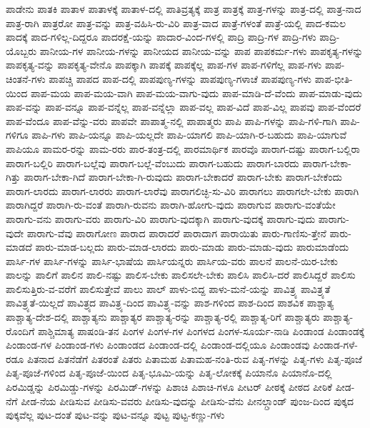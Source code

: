 {ಪಾಡೇನು
ಪಾತಕಿ
ಪಾತಾಳ
ಪಾತಾಳಕ್ಕೆ
ಪಾತಾಳ-ದಲ್ಲಿ
ಪಾತಿವ್ರತ್ಯಕ್ಕೆ
ಪಾತ್ರ
ಪಾತ್ರಕ್ಕೆ
ಪಾತ್ರ-ಗಳನ್ನು
ಪಾತ್ರ-ದಲ್ಲಿ
ಪಾತ್ರ-ನಾದ
ಪಾತ್ರ-ರಾಗಿ
ಪಾತ್ರರೋ
ಪಾತ್ರ-ವನ್ನು
ಪಾತ್ರ-ವಹಿಸಿ-ರು-ವಿರಿ
ಪಾತ್ರ-ವಾದ
ಪಾತ್ರೆ-ಗಳಂತೆ
ಪಾತ್ರೆ-ಯಲ್ಲಿ
ಪಾದ-ಕಮಲ
ಪಾದಕ್ಕೆ
ಪಾದ-ಗಳಿಲ್ಲ-ದಿದ್ದರೂ
ಪಾದರಕ್ಷೆ-ಯನ್ನು
ಪಾದಾರ-ವಿಂದ-ಗಳಲ್ಲಿ
ಪಾದ್ರಿ
ಪಾದ್ರಿ-ಗಳ
ಪಾದ್ರಿ-ಗಳು
ಪಾದ್ರಿ-ಯೊಬ್ಬರು
ಪಾನೀಯ-ಗಳ
ಪಾನೀಯ-ಗಳನ್ನು
ಪಾನೀಯದ
ಪಾನೀಯ-ವನ್ನು
ಪಾಪ
ಪಾಪಕರ್ಮ-ಗಳು
ಪಾಪಕೃತ್ಯ-ಗಳನ್ನು
ಪಾಪಕೃತ್ಯ-ವನ್ನು
ಪಾಪಕೃತ್ಯ-ವೇನೊ
ಪಾಪಕ್ಕಾಗಿ
ಪಾಪಕ್ಕೆ
ಪಾಪಕ್ಕೆಲ್ಲ
ಪಾಪ-ಗಳ
ಪಾಪ-ಗಳಿಗೆಲ್ಲ
ಪಾಪ-ಗಳು
ಪಾಪ-ಚಿಂತನೆ-ಗಳು
ಪಾಪಚ್ಚಿ
ಪಾಪದ
ಪಾಪ-ದಲ್ಲಿ
ಪಾಪಪುಣ್ಯ-ಗಳನ್ನು
ಪಾಪಪುಣ್ಯ-ಗಳಾಚೆ
ಪಾಪಪುಣ್ಯ-ಗಳು
ಪಾಪ-ಭೀತಿ-ಯಿಂದ
ಪಾಪ-ಮಯ
ಪಾಪ-ಮಯ-ವಾಗಿ
ಪಾಪ-ಮಯ-ವಾಗು-ವುದು
ಪಾಪ-ಮಾಡಿ-ದೆ-ವೆಂದು
ಪಾಪ-ಮಾಡು-ವುದು
ಪಾಪ-ವನ್ನು
ಪಾಪ-ವನ್ನೂ
ಪಾಪ-ವನ್ನೆಲ್ಲ
ಪಾಪ-ವನ್ನೆಲ್ಲಾ
ಪಾಪ-ವಲ್ಲ
ಪಾಪ-ವಿದೆ
ಪಾಪ-ವಿಲ್ಲ
ಪಾಪವು
ಪಾಪ-ವೆಂದರೆ
ಪಾಪ-ವೆಂದೂ
ಪಾಪ-ವೆನ್ನು-ವರು
ಪಾಪವೇ
ಪಾಪಾತ್ಮ-ನಲ್ಲಿ
ಪಾಪಾತ್ಮರು
ಪಾಪಿ
ಪಾಪಿ-ಗಳನ್ನು
ಪಾಪಿ-ಗಳಿ-ಗಾಗಿ
ಪಾಪಿ-ಗಳಿಗೂ
ಪಾಪಿ-ಗಳು
ಪಾಪಿ-ಯನ್ನೂ
ಪಾಪಿ-ಯಲ್ಲದೇ
ಪಾಪಿ-ಯಾಗಲಿ
ಪಾಪಿ-ಯಾಗಿ-ರ-ಬಹುದು
ಪಾಪಿ-ಯಾಗುವೆ
ಪಾಪಿಯೂ
ಪಾಮರ-ರನ್ನು
ಪಾಮ-ರರು
ಪಾರ-ತಂತ್ರ-ದಲ್ಲಿ
ಪಾರಮಾರ್ಥಿಕ
ಪಾರವೊ
ಪಾರಾಗ-ದಷ್ಟು
ಪಾರಾಗ-ಬಲ್ಲಿರಾ
ಪಾರಾಗ-ಬಲ್ಲಿರಿ
ಪಾರಾಗ-ಬಲ್ಲೆವು
ಪಾರಾಗ-ಬಲ್ಲೆ-ವೆಂಬುದು
ಪಾರಾಗ-ಬಹುದು
ಪಾರಾಗ-ಬಾರದು
ಪಾರಾಗ-ಬೇಕಾ-ಗಿತ್ತು
ಪಾರಾಗ-ಬೇಕಾ-ಗಿದೆ
ಪಾರಾಗ-ಬೇಕಾ-ಗಿ-ರುವುದು
ಪಾರಾಗ-ಬೇಕಾದರೆ
ಪಾರಾಗ-ಬೇಕು
ಪಾರಾಗ-ಬೇಕೆಂದು
ಪಾರಾಗ-ಲಾರದು
ಪಾರಾಗ-ಲಾರರು
ಪಾರಾಗ-ಲಾರೆವು
ಪಾರಾಗಲಿಚ್ಛಿ-ಸು-ವಿರಿ
ಪಾರಾಗಲು
ಪಾರಾಗಲೇ-ಬೇಕು
ಪಾರಾಗಿ
ಪಾರಾಗಿದ್ದರೆ
ಪಾರಾಗಿ-ರು-ವಂತೆ
ಪಾರಾಗಿ-ರುವನು
ಪಾರಾಗಿ-ಹೋಗು-ವುದು
ಪಾರಾಗುವ
ಪಾರಾಗು-ವಂತೆಯೇ
ಪಾರಾಗು-ವನು
ಪಾರಾಗು-ವರು
ಪಾರಾಗು-ವಿರಿ
ಪಾರಾಗು-ವುದಕ್ಕಾಗಿ
ಪಾರಾಗು-ವುದಕ್ಕೆ
ಪಾರಾಗು-ವುದು
ಪಾರಾಗು-ವುದೇ
ಪಾರಾಗು-ವೆವು
ಪಾರಾಗೋಣ
ಪಾರಾದ
ಪಾರಾದರೆ
ಪಾರಾದಾಗ
ಪಾರಾಯಿತು
ಪಾರು-ಗಾಣಿಸು-ತ್ತೇನೆ
ಪಾರು-ಮಾಡದೆ
ಪಾರು-ಮಾಡ-ಬಲ್ಲದು
ಪಾರು-ಮಾಡ-ಲಾರದು
ಪಾರು-ಮಾಡು
ಪಾರು-ಮಾಡು-ವುದು
ಪಾರುಮಾಡೆಂದು
ಪಾರ್ಸಿ-ಗಳ
ಪಾರ್ಸಿ-ಗಳನ್ನು
ಪಾರ್ಸಿ-ಭಾಷೆಯ
ಪಾರ್ಸಿಯನ್ನರು
ಪಾರ್ಸಿಯ-ವರು
ಪಾಲನೆ
ಪಾಲನೆ-ಯಿರ-ಬೇಕು
ಪಾಲನ್ನು
ಪಾಲಿಗೆ
ಪಾಲಿನ
ಪಾಲಿ-ನಷ್ಟು
ಪಾಲಿಸ-ಬೇಕು
ಪಾಲಿಸಲೇ-ಬೇಕು
ಪಾಲಿಸಿ
ಪಾಲಿಸಿ-ದರೆ
ಪಾಲಿಸಿದ್ದರೆ
ಪಾಲಿಸು
ಪಾಲಿಸುತ್ತಿರು-ವ-ವರೆಗೆ
ಪಾಲಿಸುತ್ತೇವೆ
ಪಾಲು
ಪಾಲ್
ಪಾಳು-ಬಿದ್ದ
ಪಾಳು-ಮನೆ-ಯನ್ನು
ಪಾವಿತ್ರ್ಯ
ಪಾವಿತ್ರ್ಯತೆ
ಪಾವಿತ್ರ್ಯತೆ-ಯಿಲ್ಲದೆ
ಪಾವಿತ್ರ್ಯದ
ಪಾವಿತ್ರ್ಯ-ದಿಂದ
ಪಾವಿತ್ರ್ಯ-ವನ್ನು
ಪಾಶ-ಗಳಿಂದ
ಪಾಶ-ದಿಂದ
ಪಾಶವಿಕ
ಪಾಶ್ಚಾತ್ಯ
ಪಾಶ್ಚಾತ್ಯ-ದೇಶ-ದಲ್ಲಿ
ಪಾಶ್ಚಾತ್ಯನು
ಪಾಶ್ಚಾತ್ಯರ
ಪಾಶ್ಚಾತ್ಯ-ರನ್ನು
ಪಾಶ್ಚಾತ್ಯ-ರಲ್ಲಿ
ಪಾಶ್ಚಾತ್ಯ-ರಿಗೆ
ಪಾಶ್ಚಾತ್ಯರು
ಪಾಶ್ಚಾತ್ಯ-ರೊಂದಿಗೆ
ಪಾಶ್ಚಿಮಾತ್ಯ
ಪಾಷಂಡಿ-ತನ
ಪಿಂಗಳ
ಪಿಂಗಳ-ಗಳ
ಪಿಂಗಳದ
ಪಿಂಗಳ-ಸೂರ್ಯ-ನಾಡಿ
ಪಿಂಡಾಂಡ
ಪಿಂಡಾಂಡಕ್ಕೆ
ಪಿಂಡಾಂಡ-ಗಳ
ಪಿಂಡಾಂಡ-ಗಳು
ಪಿಂಡಾಂಡದ
ಪಿಂಡಾಂಡ-ದಲ್ಲಿ
ಪಿಂಡಾಂಡ-ದಲ್ಲಿಯೂ
ಪಿಂಡಾಂಡವು
ಪಿಂಡಾಡ-ಗಳೆ-ರಡೂ
ಪಿತನಾದ
ಪಿತನೆಡೆಗೆ
ಪಿತರಂತೆ
ಪಿತರು
ಪಿತಾಮಹ
ಪಿತಾಮಹ-ನಂತಿ-ರುವ
ಪಿತೃ-ಗಳನ್ನು
ಪಿತೃ-ಗಳು
ಪಿತೃ-ಪೂಜೆ
ಪಿತೃ-ಪೂಜೆ-ಗಳಿಂದ
ಪಿತೃ-ಪೂಜೆ-ಯಿಂದ
ಪಿತೃ-ಭೂಮಿ-ಯನ್ನು
ಪಿತೃ-ಲೋಕಕ್ಕೆ
ಪಿಯಾನೊ
ಪಿಯಾನೊ-ದಲ್ಲಿ
ಪಿರಮಿಡ್ಡನ್ನು
ಪಿರಮಿಡ್ಡು-ಗಳನ್ನು
ಪಿರಮಿಡ್-ಗಳನ್ನು
ಪಿಶಾಚಿ
ಪಿಶಾಚಿ-ಗಳೂ
ಪೀಟರ್
ಪೀಠಕ್ಕೆ
ಪೀಠದ
ಪೀಠಿಕೆ
ಪೀಡ-ನೆಗೆ
ಪೀಡ-ನೆಯ
ಪೀಡಿಸುವ
ಪೀಡಿಸು-ವವರು
ಪೀಡಿಸು-ವುದನ್ನು
ಪೀಡಿಸು-ವೆನು
ಪೀನಲ್ಗ್ರಾಂಡ್
ಪುಂಜ-ದಿಂದ
ಪುಕ್ಕದ
ಪುಕ್ಕವೆಲ್ಲ
ಪುಟ-ದಂತೆ
ಪುಟ-ವನ್ನು
ಪುಟ-ವನ್ನೂ
ಪುಟ್ಟ
ಪುಟ್ಟ-ಕಣ್ಣು-ಗಳು
}
